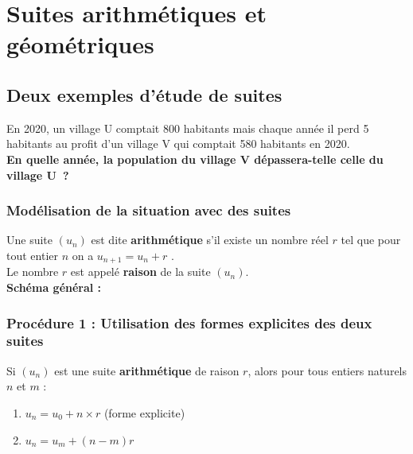 \documentclass[a4paper,11pt,cours]{nsi} %
\begin{document}
\setcounter{chapter}{5} %



\chapter{Suites arithmétiques et\\ géométriques}


\setlength{\columnseprule}{0.5pt}
\setlength{\columnsep}{1cm}



\section{Deux exemples d'étude de suites}
\begin{exercice}[ ]
	En 2020, un village U comptait 800 habitants mais chaque année il perd 5 habitants au profit d’un village V qui comptait 580 habitants en 2020.\\[.5em]
	\textbf{En quelle année, la population du village V dépassera-telle celle du village U ?}
\end{exercice}

\subsection*{Modélisation de la situation avec des suites}
\begin{definition}[ ]
	Une suite $(u_n)$ est dite \textbf{arithmétique} s'il existe un nombre réel $r$ tel que pour tout entier $n$ on a $u_{n+1}=u_n+r$ .\\
	Le nombre $r$ est appelé \textbf{raison} de la suite $(u_n)$.\\[.5em]
	\textbf{Schéma général :}
	\vspace{2cm}
\end{definition}


\subsection*{Procédure 1 : Utilisation des formes explicites des deux suites}
\begin{propriete}[ ]
	Si $(u_n)$ est une suite \textbf{arithmétique} de raison $r$, alors pour tous entiers naturels $n$ et $m$ :
	\begin{enumerate}[label=\textbullet]
		\item 	$u_n = u_0+n\times r$ \hspace{.5cm}(forme explicite)
		\item 	$u_n=u_m+(n-m)r$	
    \end{enumerate}
  
\end{propriete}
\end{document}
